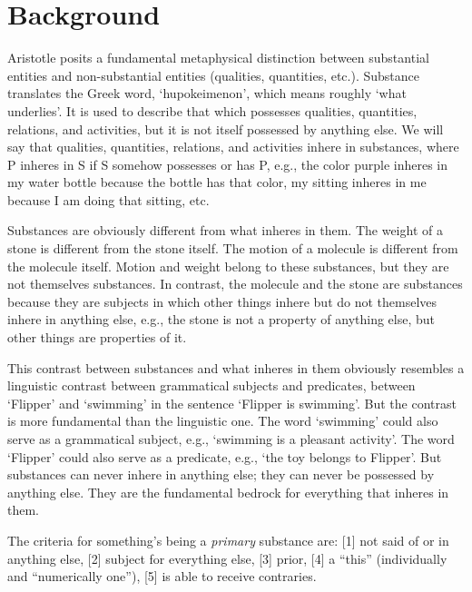 \documentclass[oneside]{article}
\begin{document}
\thispagestyle{fancy}



\section*{Background}

\noindent Aristotle posits a fundamental metaphysical distinction between substantial entities and non-substantial entities (qualities, quantities, etc.). Substance translates the Greek word, ‘hupokeimenon’, which means roughly ‘what underlies’. It is used to describe that which possesses qualities, quantities, relations, and activities, but it is not itself possessed by anything else. We will say that qualities, quantities, relations, and activities inhere in substances, where P inheres in S if S somehow possesses or has P, e.g., the color purple inheres in my water bottle because the bottle has that color, my sitting inheres in me because I am doing that sitting, etc. 

Substances are obviously different from what inheres in them. The weight of a stone is different from the stone itself. The motion of a molecule is different from the molecule itself. Motion and weight belong to these substances, but they are not themselves substances. In contrast, the molecule and the stone are substances because they are subjects in which other things inhere but do not themselves inhere in anything else, e.g., the stone is not a property of anything else, but other things are properties of it.

This contrast between substances and what inheres in them obviously resembles a linguistic contrast between grammatical subjects and predicates, between ‘Flipper’ and ‘swimming’ in the sentence ‘Flipper is swimming’. But the contrast is more fundamental than the linguistic one. The word ‘swimming’ could also serve as a grammatical subject, e.g., ‘swimming is a pleasant activity’. The word ‘Flipper’ could also serve as a predicate, e.g., ‘the toy belongs to Flipper’. But substances can never inhere in anything else; they can never be possessed by anything else. They are the fundamental bedrock for everything that inheres in them.

\vspace*{2mm}

\noindent The criteria for something's being a \emph{primary} substance are: [1] not said of or in anything else, [2] subject for everything else, [3] prior, [4] a ``this'' (individually and ``numerically one''), [5] is able to receive contraries.
\vspace*{2mm}
\end{document}
